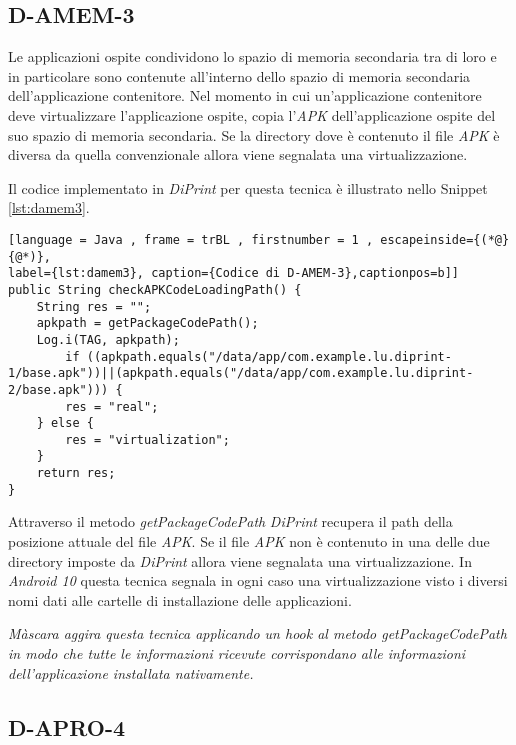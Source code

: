 \subsection*{D-AMEM-3}
\label{d-amen-3}

Le applicazioni ospite condividono lo spazio di memoria secondaria tra di loro e in particolare sono contenute all'interno dello spazio di memoria secondaria dell'applicazione contenitore.
Nel momento in cui un'applicazione contenitore deve virtualizzare l'applicazione ospite, copia l'\emph{APK} dell'applicazione ospite del suo spazio di memoria secondaria. Se la directory dove è contenuto il file \emph{APK} è diversa da quella convenzionale allora viene segnalata una virtualizzazione.

Il codice implementato in \emph{DiPrint} per questa tecnica è illustrato nello Snippet \ref{lst:damem3}.

\begin{lstlisting}[language = Java , frame = trBL , firstnumber = 1 , escapeinside={(*@}{@*)},
label={lst:damem3}, caption={Codice di D-AMEM-3},captionpos=b]]
public String checkAPKCodeLoadingPath() {
    String res = "";
    apkpath = getPackageCodePath();
    Log.i(TAG, apkpath);
        if ((apkpath.equals("/data/app/com.example.lu.diprint-1/base.apk"))||(apkpath.equals("/data/app/com.example.lu.diprint-2/base.apk"))) {
        res = "real";
    } else {
        res = "virtualization";
    }
    return res;
}

\end{lstlisting}

Attraverso il metodo \emph{getPackageCodePath} \emph{DiPrint} recupera il path della posizione attuale del file \emph{APK}.
Se il file \emph{APK} non è contenuto in una delle due directory imposte da \emph{DiPrint} allora viene segnalata una virtualizzazione.
In \emph{Android 10} questa tecnica segnala in ogni caso una virtualizzazione visto i diversi nomi dati alle cartelle di installazione delle applicazioni.

\emph{Màscara aggira questa tecnica applicando un hook al metodo getPackageCodePath in modo che tutte le informazioni ricevute corrispondano alle informazioni dell'applicazione installata nativamente.}




\newpage
\subsection*{D-APRO-4}
\label{d-apro-4}

